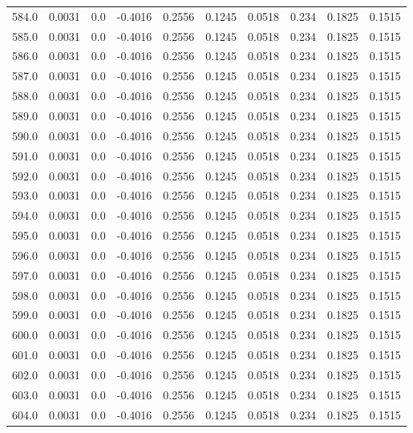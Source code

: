 \begin{longtable}{lrrrrrrrrr}
584.0 & 0.0031 & 0.0 & -0.4016 & 0.2556 & 0.1245 & 0.0518 & 0.234 & 0.1825 & 0.1515 \\
585.0 & 0.0031 & 0.0 & -0.4016 & 0.2556 & 0.1245 & 0.0518 & 0.234 & 0.1825 & 0.1515 \\
586.0 & 0.0031 & 0.0 & -0.4016 & 0.2556 & 0.1245 & 0.0518 & 0.234 & 0.1825 & 0.1515 \\
587.0 & 0.0031 & 0.0 & -0.4016 & 0.2556 & 0.1245 & 0.0518 & 0.234 & 0.1825 & 0.1515 \\
588.0 & 0.0031 & 0.0 & -0.4016 & 0.2556 & 0.1245 & 0.0518 & 0.234 & 0.1825 & 0.1515 \\
589.0 & 0.0031 & 0.0 & -0.4016 & 0.2556 & 0.1245 & 0.0518 & 0.234 & 0.1825 & 0.1515 \\
590.0 & 0.0031 & 0.0 & -0.4016 & 0.2556 & 0.1245 & 0.0518 & 0.234 & 0.1825 & 0.1515 \\
591.0 & 0.0031 & 0.0 & -0.4016 & 0.2556 & 0.1245 & 0.0518 & 0.234 & 0.1825 & 0.1515 \\
592.0 & 0.0031 & 0.0 & -0.4016 & 0.2556 & 0.1245 & 0.0518 & 0.234 & 0.1825 & 0.1515 \\
593.0 & 0.0031 & 0.0 & -0.4016 & 0.2556 & 0.1245 & 0.0518 & 0.234 & 0.1825 & 0.1515 \\
594.0 & 0.0031 & 0.0 & -0.4016 & 0.2556 & 0.1245 & 0.0518 & 0.234 & 0.1825 & 0.1515 \\
595.0 & 0.0031 & 0.0 & -0.4016 & 0.2556 & 0.1245 & 0.0518 & 0.234 & 0.1825 & 0.1515 \\
596.0 & 0.0031 & 0.0 & -0.4016 & 0.2556 & 0.1245 & 0.0518 & 0.234 & 0.1825 & 0.1515 \\
597.0 & 0.0031 & 0.0 & -0.4016 & 0.2556 & 0.1245 & 0.0518 & 0.234 & 0.1825 & 0.1515 \\
598.0 & 0.0031 & 0.0 & -0.4016 & 0.2556 & 0.1245 & 0.0518 & 0.234 & 0.1825 & 0.1515 \\
599.0 & 0.0031 & 0.0 & -0.4016 & 0.2556 & 0.1245 & 0.0518 & 0.234 & 0.1825 & 0.1515 \\
600.0 & 0.0031 & 0.0 & -0.4016 & 0.2556 & 0.1245 & 0.0518 & 0.234 & 0.1825 & 0.1515 \\
601.0 & 0.0031 & 0.0 & -0.4016 & 0.2556 & 0.1245 & 0.0518 & 0.234 & 0.1825 & 0.1515 \\
602.0 & 0.0031 & 0.0 & -0.4016 & 0.2556 & 0.1245 & 0.0518 & 0.234 & 0.1825 & 0.1515 \\
603.0 & 0.0031 & 0.0 & -0.4016 & 0.2556 & 0.1245 & 0.0518 & 0.234 & 0.1825 & 0.1515 \\
604.0 & 0.0031 & 0.0 & -0.4016 & 0.2556 & 0.1245 & 0.0518 & 0.234 & 0.1825 & 0.1515 \\

\end{longtable}
